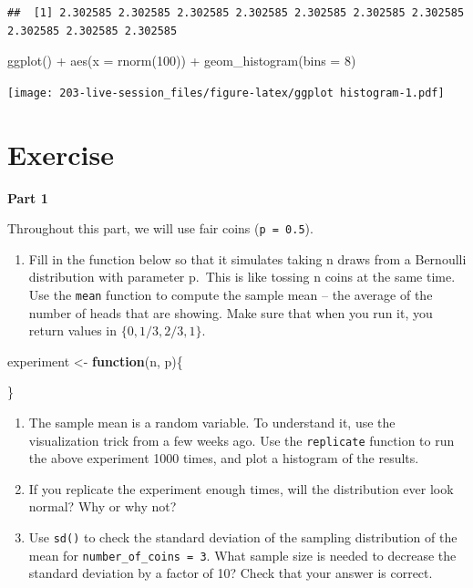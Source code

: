 \documentclass[
]{book}
\newenvironment{Shaded}{\begin{snugshade}}{\end{snugshade}}
\newcommand{\AttributeTok}[1]{\textcolor[rgb]{0.77,0.63,0.00}{#1}}
\newcommand{\ControlFlowTok}[1]{\textcolor[rgb]{0.13,0.29,0.53}{\textbf{#1}}}
\newcommand{\DecValTok}[1]{\textcolor[rgb]{0.00,0.00,0.81}{#1}}
\newcommand{\FunctionTok}[1]{\textcolor[rgb]{0.00,0.00,0.00}{#1}}
\newcommand{\NormalTok}[1]{#1}
\newcommand{\OtherTok}[1]{\textcolor[rgb]{0.56,0.35,0.01}{#1}}
\newcommand{\SpecialCharTok}[1]{\textcolor[rgb]{0.00,0.00,0.00}{#1}}
\newcommand{\StringTok}[1]{\textcolor[rgb]{0.31,0.60,0.02}{#1}}
\providecommand{\tightlist}{%
  \setlength{\itemsep}{0pt}\setlength{\parskip}{0pt}}
\theoremstyle{definition}
\theoremstyle{definition}
\theoremstyle{definition}
\theoremstyle{definition}
\theoremstyle{remark}
\begin{document}
\begin{verbatim}
##  [1] 2.302585 2.302585 2.302585 2.302585 2.302585 2.302585 2.302585 2.302585 2.302585 2.302585
\end{verbatim}

\begin{Shaded}
\begin{Highlighting}[]
\FunctionTok{ggplot}\NormalTok{() }\SpecialCharTok{+} 
  \FunctionTok{aes}\NormalTok{(}\AttributeTok{x =} \FunctionTok{rnorm}\NormalTok{(}\DecValTok{100}\NormalTok{)) }\SpecialCharTok{+} 
  \FunctionTok{geom\_histogram}\NormalTok{(}\AttributeTok{bins =} \StringTok{\textquotesingle{}8\textquotesingle{}}\NormalTok{) }
\end{Highlighting}
\end{Shaded}

\texttt{[image: 203-live-session\_files/figure-latex/ggplot histogram-1.pdf]}

\hypertarget{exercise}{%
\section{Exercise}\label{exercise}}

\textbf{Part 1}

Throughout this part, we will use fair coins (\texttt{p\ =\ 0.5}).

\begin{enumerate}
\def\labelenumi{\arabic{enumi}.}
\tightlist
\item
  Fill in the function below so that it simulates taking n draws from a Bernoulli distribution with parameter p.~This is like tossing n coins at the same time. Use the \texttt{mean} function to compute the sample mean -- the average of the number of heads that are showing. Make sure that when you run it, you return values in \(\{0,1/3,2/3,1\}\).
\end{enumerate}

\begin{Shaded}
\begin{Highlighting}[]
\NormalTok{experiment }\OtherTok{\textless{}{-}} \ControlFlowTok{function}\NormalTok{(n, p)\{}

\NormalTok{  \}}
\end{Highlighting}
\end{Shaded}

\begin{enumerate}
\def\labelenumi{\arabic{enumi}.}
\setcounter{enumi}{1}
\item
  The sample mean is a random variable. To understand it, use the visualization trick from a few weeks ago. Use the \texttt{replicate} function to run the above experiment 1000 times, and plot a histogram of the results.
\item
  If you replicate the experiment enough times, will the distribution ever look normal? Why or why not?
\item
  Use \texttt{sd()} to check the standard deviation of the sampling distribution of the mean for \texttt{number\_of\_coins\ =\ 3}. What sample size is needed to decrease the standard deviation by a factor of 10? Check that your answer is correct.
\end{enumerate}
\end{document}
